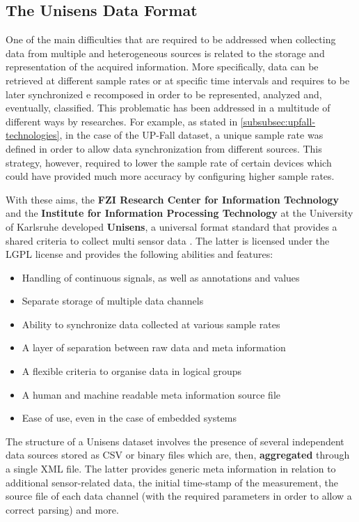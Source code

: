 \subsection{The Unisens Data Format}\label{subsec:unisens}

One of the main difficulties that are required to be addressed when collecting data from multiple and heterogeneous sources is related to the storage and representation of the acquired information. More specifically, data can be retrieved at different sample rates or at specific time intervals and requires to be later synchronized e recomposed in order to be represented, analyzed and, eventually, classified. This problematic has been addressed in a multitude of different ways by researches. For example, as stated in \ref{subsubsec:upfall-technologies}, in the case of the UP-Fall dataset, a unique sample rate was defined in order to allow data synchronization from different sources. This strategy, however, required to lower the sample rate of certain devices which could have provided much more accuracy by configuring higher sample rates.

With these aims, the \textbf{FZI Research Center for Information Technology} and the \textbf{Institute for Information Processing Technology} at the University of Karlsruhe developed \textbf{Unisens}, a universal format standard that provides a shared criteria to collect multi sensor data \cite{unisens}. The latter is licensed under the LGPL license and provides the following abilities and features: 

\begin{itemize}
    \item Handling of continuous signals, as well as annotations and values
    \item Separate storage of multiple data channels
    \item Ability to synchronize data collected at various sample rates
    \item A layer of separation between raw data and meta information
    \item A flexible criteria to organise data in logical groups
    \item A human and machine readable meta information source file
    \item Ease of use, even in the case of embedded systems
\end{itemize}

The structure of a Unisens dataset involves the presence of several independent data sources stored as CSV or binary files which are, then, \textbf{aggregated} through a single XML file. The latter provides generic meta information in relation to additional sensor-related data, the initial time-stamp of the measurement, the source file of each data channel (with the required parameters in order to allow a correct parsing) and more.

